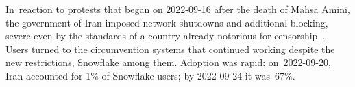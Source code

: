 \documentclass[letterpaper,twocolumn]{article}
\begin{document}
In~reaction to protests that began on \mbox{2022-09-16}
after the death of Mahsa Amini,
the government of Iran imposed network shutdowns
and additional blocking,
severe even by the standards of a country already notorious
for censorship~\cite{ooni-2022-iran-blocks-social-media-mahsa-amini-protests}.
Users turned to the circumvention systems
that continued working despite the new restrictions,
Snowflake among them.
Adoption was rapid:
on~\mbox{2022-09-20}, Iran accounted for 1\% of Snowflake users;
by \mbox{2022-09-24} it was~67\%.
\end{document}
